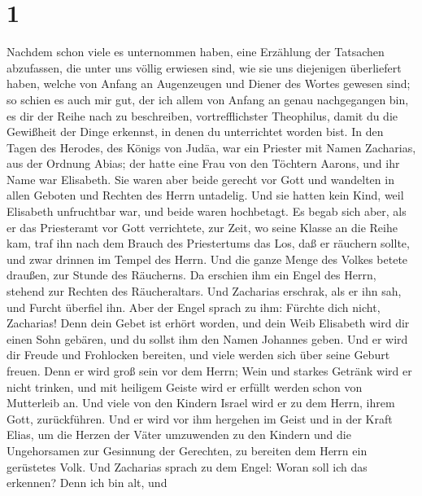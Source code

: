 \hypertarget{section}{%
\section{1}\label{section}}

 Nachdem schon viele es unternommen haben, eine Erzählung
der Tatsachen abzufassen, die unter uns völlig erwiesen sind,
 wie sie uns diejenigen überliefert haben, welche von
Anfang an Augenzeugen und Diener des Wortes gewesen sind; 
so schien es auch mir gut, der ich allem von Anfang an genau
nachgegangen bin, es dir der Reihe nach zu beschreiben, vortrefflichster
Theophilus,  damit du die Gewißheit der Dinge erkennst, in
denen du unterrichtet worden bist.  In den Tagen des
Herodes, des Königs von Judäa, war ein Priester mit Namen Zacharias, aus
der Ordnung Abias; der hatte eine Frau von den Töchtern Aarons, und ihr
Name war Elisabeth.  Sie waren aber beide gerecht vor Gott
und wandelten in allen Geboten und Rechten des Herrn untadelig.
 Und sie hatten kein Kind, weil Elisabeth unfruchtbar war,
und beide waren hochbetagt.  Es begab sich aber, als er
das Priesteramt vor Gott verrichtete, zur Zeit, wo seine Klasse an die
Reihe kam,  traf ihn nach dem Brauch des Priestertums das
Los, daß er räuchern sollte, und zwar drinnen im Tempel des Herrn.
 Und die ganze Menge des Volkes betete draußen, zur
Stunde des Räucherns.  Da erschien ihm ein Engel des
Herrn, stehend zur Rechten des Räucheraltars.  Und
Zacharias erschrak, als er ihn sah, und Furcht überfiel ihn.
 Aber der Engel sprach zu ihm: Fürchte dich nicht,
Zacharias! Denn dein Gebet ist erhört worden, und dein Weib Elisabeth
wird dir einen Sohn gebären, und du sollst ihm den Namen Johannes geben.
 Und er wird dir Freude und Frohlocken bereiten, und
viele werden sich über seine Geburt freuen.  Denn er wird
groß sein vor dem Herrn; Wein und starkes Getränk wird er nicht trinken,
und mit heiligem Geiste wird er erfüllt werden schon von Mutterleib an.
 Und viele von den Kindern Israel wird er zu dem Herrn,
ihrem Gott, zurückführen.  Und er wird vor ihm hergehen
im Geist und in der Kraft Elias, um die Herzen der Väter umzuwenden zu
den Kindern und die Ungehorsamen zur Gesinnung der Gerechten, zu
bereiten dem Herrn ein gerüstetes Volk.  Und Zacharias
sprach zu dem Engel: Woran soll ich das erkennen? Denn ich bin alt, und
